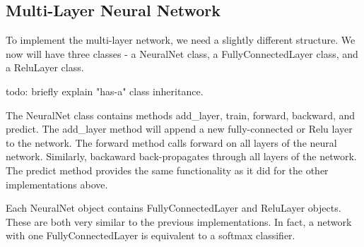 \subsection{Multi-Layer Neural Network}
To implement the multi-layer network, we need a slightly different structure.
We now will have three classes - a {\ttfamily NeuralNet} class, a
{\ttfamily FullyConnectedLayer} class, and a {\ttfamily ReluLayer} class.

todo: briefly explain "has-a" class inheritance.

The {\ttfamily NeuralNet} class contains methods {\ttfamily add\_layer},
{\ttfamily train}, {\ttfamily forward}, {\ttfamily backward}, and {\ttfamily predict}. The
{\ttfamily add\_layer} method will append a new fully-connected or Relu layer to
the network. The {\ttfamily forward} method calls {\ttfamily forward} on all layers
of the neural network. Similarly, {\ttfamily backaward} back-propagates through all
layers of the network. The {\ttfamily predict} method provides the same
functionality as it did for the other implementations above.

Each {\ttfamily NeuralNet} object contains {\ttfamily FullyConnectedLayer} and
{\ttfamily ReluLayer} objects. These are both very similar to the previous
implementations. In fact, a network with one {\ttfamily FullyConnectedLayer} is
equivalent to a softmax classifier.

